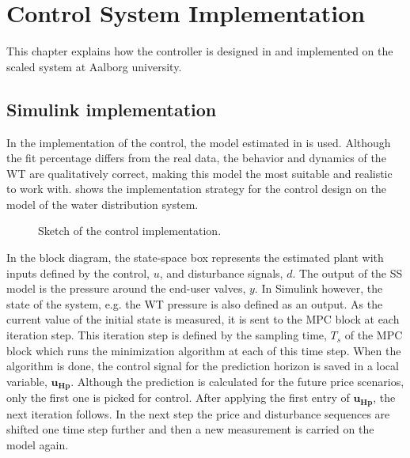 \chapter{Control System Implementation}
\label{implementation_of_controller}

This chapter explains how the controller is designed in  and implemented on the scaled system at Aalborg university.  

\section{Simulink implementation}
\label{simulink_intro}
In the implementation of the control, the model estimated in  is used. Although the fit percentage differs from the real data, the behavior and dynamics of the WT are qualitatively correct, making this model the most suitable and realistic to work with.  shows the implementation strategy for the control design on the model of the water distribution system.

\begin{figure}[H]
\centering
 
\caption{Sketch of the control implementation.}
\label{fig:control_sketch}
\end{figure}

In the block diagram, the state-space box represents the estimated plant with inputs defined by the control, $u$, and disturbance signals, $d$. The output of the SS model is the pressure around the end-user valves, $y$. In Simulink however, the state of the system, e.g. the WT pressure is also defined as an output. As the current value of the initial state is measured, it is sent to the MPC block at each iteration step. This iteration step is defined by the sampling time, $T_s$ of the MPC block which runs the minimization algorithm at each of this time step. When the algorithm is done, the control signal for the prediction horizon is saved in a local variable, $\bm{u_{Hp}}$. Although the prediction is calculated for the future price scenarios, only the first one is picked for control. After applying the first entry of $\bm{u_{Hp}}$, the next iteration follows. In the next step the price and disturbance sequences are shifted one time step further and then a new measurement is carried on the model again.

